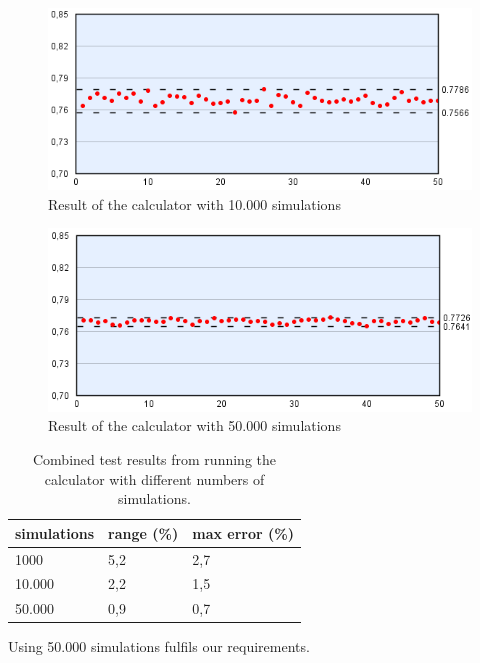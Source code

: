 \begin{figure}[H]
  \center
    \includegraphics[scale=0.775]{images/MonteCarlo/10k.png}
  \caption{Result of the calculator with 10.000 simulations \label{fig:mc10}}
\end{figure}

\begin{figure}[H]
  \center
    \includegraphics[scale=0.775]{images/MonteCarlo/50k.png}
  \caption{Result of the calculator with 50.000 simulations \label{fig:mc50}}
\end{figure}

\begin{table}[H]
  \center
  \begin{tabular}{ | l | l | l | }
    \hline
    simulations & range (\%) & max error (\%) \\
    \hline                       
    1000 & 5,2 & 2,7 \\
    10.000 & 2,2 & 1,5 \\
    50.000 & 0,9 & 0,7 \\
  \hline  
  \end{tabular}
  \caption{Combined test results from running the calculator with different numbers of simulations. \label{tab:mc-total}}
\end{table}
\vspace{4mm}

Using 50.000 simulations fulfils our requirements.

